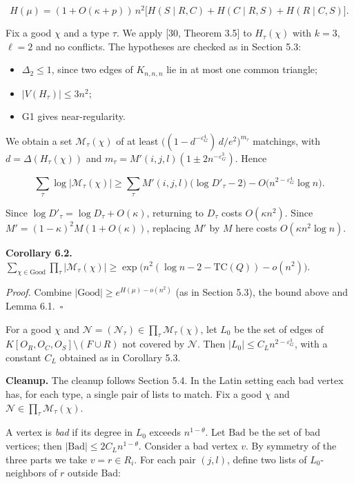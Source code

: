 \documentclass[english,11pt,a4paper]{article}
\providecommand{\tightlist}{\setlength{\itemsep}{0pt}\setlength{\parskip}{0pt}}
\begin{document}
\nopagebreak[4]
\[H(\mu)=(1+O(\kappa+p))\,n^2\bigl[H(S\mid R,C)+H(C\mid R,S)+H(R\mid C,S)\bigr].\]

Fix a good \(\chi\) and a type \(\tau\). We apply {[}30, Theorem 3.5{]} to \(H_\tau(\chi)\) with \(k=3\), \(\ell=2\) and no conflicts. The hypotheses are checked as in Section 5.3:

\begin{itemize}
\tightlist
\item
  \(\Delta_2\le1\), since two edges of \(K_{n,n,n}\) lie in at most one common triangle;
\item
  \(|V(H_\tau)|\le3n^2\);
\item
  G1 gives near-regularity.
\end{itemize}

We obtain a set \(\mathcal M_\tau(\chi)\) of at least \(\bigl((1-d^{-\varepsilon_G^4})\,d/e^2\bigr)^{m_\tau}\) matchings, with \(d=\Delta(H_\tau(\chi))\) and \(m_\tau=M'(i,j,l)(1\pm2n^{-\varepsilon_G^3})\). Hence

\nopagebreak[4]
\[\sum_\tau\log|\mathcal M_\tau(\chi)|\ge\sum_\tau M'(i,j,l)\bigl(\log D'_\tau-2\bigr)-O\bigl(n^{2-\varepsilon_G^4}\log n\bigr).\]

Since \(\log D'_\tau=\log D_\tau+O(\kappa)\), returning to \(D_\tau\) costs \(O(\kappa n^2)\). Since \(M'=(1-\kappa)^2M(1+O(\kappa))\), replacing \(M'\) by \(M\) here costs \(O(\kappa n^2\log n)\).

\textbf{Corollary 6.2.} \(\displaystyle\sum_{\chi\in\mathrm{Good}}\prod_\tau|\mathcal M_\tau(\chi)|\ge\exp\bigl(n^2(\log n-2-\mathrm{TC}(Q))-o(n^2)\bigr)\).

\emph{Proof.} Combine \(|\mathrm{Good}|\ge e^{H(\mu)-o(n^2)}\) (as in Section 5.3), the bound above and Lemma 6.1.~\(\square\)

For a good \(\chi\) and \(\mathcal N=(\mathcal N_\tau)\in\prod_\tau\mathcal M_\tau(\chi)\), let \(L_0\) be the set of edges of \(K[O_R,O_C,O_S]\setminus(F\cup R)\) not covered by \(\mathcal N\). Then \(|L_0|\le C_Ln^{2-\varepsilon_G^3}\), with a constant \(C_L\) obtained as in Corollary 5.3.

\textbf{Cleanup.} The cleanup follows Section 5.4. In the Latin setting each bad vertex has, for each type, a single pair of lists to match. Fix a good \(\chi\) and \(\mathcal N\in\prod_\tau\mathcal M_\tau(\chi)\).

A vertex is \emph{bad} if its degree in \(L_0\) exceeds \(n^{1-\theta}\). Let \(\mathrm{Bad}\) be the set of bad vertices; then \(|\mathrm{Bad}|\le2C_Ln^{1-\theta}\). Consider a bad vertex \(v\). By symmetry of the three parts we take \(v=r\in R_i\). For each pair \((j,l)\), define two lists of \(L_0\)-neighbors of \(r\) outside \(\mathrm{Bad}\):
\end{document}
